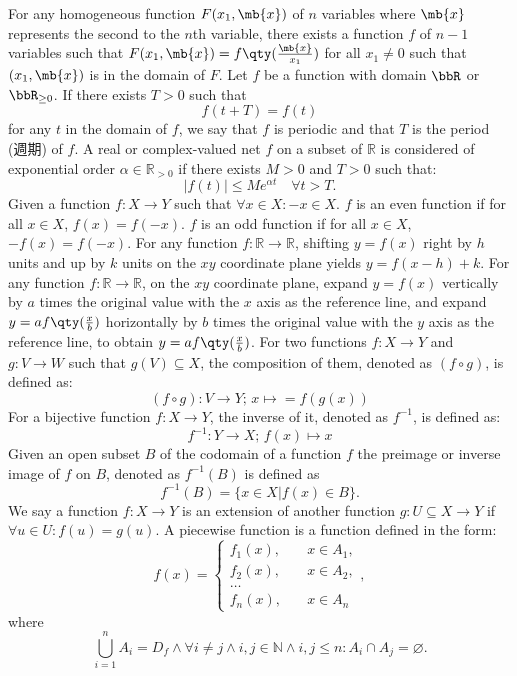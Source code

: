\documentclass[a4paper,12pt]{article}
\begin{document}
For any homogeneous function $F(x_1,\mb{x})$ of $n$ variables where $\mb{x}$ represents the second to the $n$th variable, there exists a function $f$ of $n-1$ variables such that $F(x_1,\mb{x})=f\qty(\frac{\mb{x}}{x_1})$ for all $x_1\neq 0$ such that $(x_1,\mb{x})$ is in the domain of $F$.
Let $f$ be a function with domain $\bbR$ or $\bbR_{\geq 0}$. If there exists $T>0$ such that
\[f(t+T)=f(t)\]
for any $t$ in the domain of $f$, we say that $f$ is periodic and that $T$ is the period (週期) of $f$.
A real or complex-valued net $f$ on a subset of $\mathbb{R}$ is considered of exponential order $\alpha\in\mathbb{R}_{>0}$ if there exists $M>0$ and $T>0$ such that:
\[|f(t)|\leq Me^{\alpha t}\quad \forall t>T.\]
Given a function $f\colon X\to Y$ such that $\forall x\in X\colon -x\in X$.
$f$ is an even function if for all $x\in X$, $f(x)=f(-x)$.
$f$ is an odd function if for all $x\in X$, $-f(x)=f(-x)$.
For any function $f\colon\mathbb{R}\to\mathbb{R}$, shifting $y=f(x)$ right by $h$ units and up by $k$ units on the $xy$ coordinate plane yields $y=f(x-h)+k$.
For any function $f\colon\mathbb{R}\to\mathbb{R}$, on the $xy$ coordinate plane, expand $y=f(x)$ vertically by $a$ times the original value with the $x$ axis as the reference line, and expand $y=af\qty(\frac{x}{b})$ horizontally by $b$ times the original value with the $y$ axis as the reference line, to obtain $y=af\qty(\frac{x}{b})$.
For two functions $f\colon X\to Y$ and $g\colon V\to W$ such that $g(V)\subseteq X$, the composition of them, denoted as $(f\circ g)$, is defined as:
\[(f \circ g)\colon V\to Y;\,x\mapsto = f(g(x))\]
For a bijective function $f\colon X\to Y$, the inverse of it, denoted as $f^{-1}$, is defined as:
\[f^{-1}\colon Y\to X;\,f(x)\mapsto x\]
Given an open subset $B$ of the codomain of a function $f$ the preimage or inverse image of $f$ on $B$, denoted as $f^{-1}(B)$ is defined as
\[f^{-1}(B)=\{x\in X|f(x)\in B\}.\]
We say a function $f\colon X\to Y$ is an extension of another function $g\colon U\subseteq X\to Y$ if $\forall u\in U\colon f(u)=g(u)$.
A piecewise function is a function defined in the form:
\[f(x) =
\begin{cases}
f_1(x), & \quad x\in A_1, \\
f_2(x), & \quad x\in A_2, \\
\dots  \\
f_n(x), & \quad x \in A_n
\end{cases},\]
where
\[\bigcup_{i=1}^nA_i=D_f\land\forall i\neq j\land i,j\in\mathbb{N}\land i,j\leq n\colon A_i\cap A_j=\varnothing.\]
\end{document}
